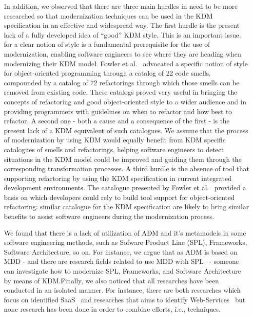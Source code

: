In addition, we observed that there are three main hurdles in need to be more researched so that modernization techniques can be used in the KDM specification in an effective and widespread way. The first hurdle is the present lack of a fully developed idea of ``good'' KDM style. This is an important issue, for a clear notion of style is a fundamental prerequisite for the use of modernization, enabling software engineers to see where they are heading when modernizing their KDM model. Fowler et al.~\cite{refactImpro} advocated a specific notion of style for object-oriented programming through a catalog of 22 code smells, compounded by a catalog of 72 refactorings through which those smells can be removed from existing code. These catalogs proved very useful in bringing the concepts of refactoring and good object-oriented style to a wider audience and in providing programmers with guidelines on when to refactor and how best to refactor. A second one - both a cause and a consequence of the first - is the present lack of a KDM equivalent of such catalogues. We assume that the process of modernization by using KDM would equally benefit from KDM specific catalogues of smells and refactorings, helping software engineers to detect situations in the KDM model could be improved and guiding them through the corresponding transformation processes. A third hurdle is the absence of tool that supporting refactoring by using the KDM specification in current integrated development environments. The catalogue presented by Fowler et al.~\cite{refactImpro} provided a basis on which developers could rely to build tool support for object-oriented refactoring: similar catalogue for the KDM specification are likely to bring similar benefits to assist software engineers during the modernization process.

We found that there is a lack of utilization of ADM and it's metamodels in some software engineering methods, such as Sofware Product Line (SPL), Frameworks, Software Architecture, so on. For instance, we argue that as ADM is based on MDD - and there are research fields related to use MDD with SPL~\cite{4335247} - someone can investigate how to modernize SPL, Frameworks, and Software Architecture by means of KDM.Finally, we also noticed that all researches have been conducted in an isolated manner. For instance, there are both researches which focus on identified SaaS~\cite{5741334, SMR:SMR582} and researches that aims to identify Web-Services~\cite{delCastillo:2009:PRP:1529282.1529753, ICEISPerez:CastilloGCP12} but none research has been done in order to combine efforts, i.e., techniques. 